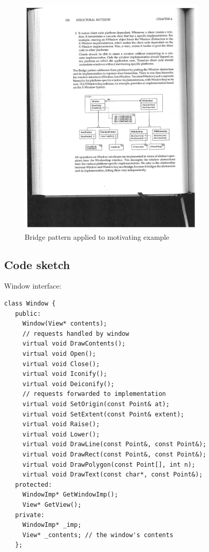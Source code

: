 \documentclass[11pt]{report}
\begin{document}
\begin{figure}
\includegraphics[width=0.8\textwidth]{bridge-2.pdf}
\caption{Bridge pattern applied to motivating example }
\end{figure}

\subsection{Code sketch}

Window interface:
\begin{lstlisting}
class Window {
   public:
     Window(View* contents);
     // requests handled by window
     virtual void DrawContents();
     virtual void Open();
     virtual void Close();
     virtual void Iconify();
     virtual void Deiconify();
     // requests forwarded to implementation
     virtual void SetOrigin(const Point& at);
     virtual void SetExtent(const Point& extent);
     virtual void Raise();
     virtual void Lower();
     virtual void DrawLine(const Point&, const Point&);
     virtual void DrawRect(const Point&, const Point&);
     virtual void DrawPolygon(const Point[], int n);
     virtual void DrawText(const char*, const Point&);
   protected:
     WindowImp* GetWindowImp();
     View* GetView();
   private:
     WindowImp* _imp;
     View* _contents; // the window's contents
   };
\end{lstlisting}
\end{document}
